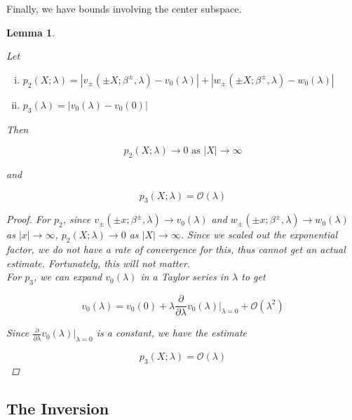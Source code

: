 \documentclass[12pt]{article}
\newtheorem{lemma}{Lemma}
\begin{document}
Finally, we have bounds involving the center subspace.


\begin{lemma}\label{centerbounds}

Let
\begin{enumerate}[(i)]
\item $p_2(X; \lambda) = |v_\pm(\pm X; \beta^\pm, \lambda) - v_0(\lambda)| + |w_\pm(\pm X; \beta^\pm, \lambda) - w_0(\lambda)|$
\item $p_3(\lambda) = |v_0(\lambda) - v_0(0)|$
\end{enumerate}

Then 

\begin{equation}\label{p2limit}
p_2(X; \lambda) \rightarrow 0 \text{ as } |X| \rightarrow \infty
\end{equation}

and

\begin{equation}\label{p3bound}
p_3(X; \lambda) = \mathcal{O}(\lambda)  
\end{equation}

\begin{proof}

For $p_2$, since $v_\pm(\pm x; \beta^\pm, \lambda) \rightarrow v_0(\lambda)$ and $w_\pm(\pm x; \beta^\pm, \lambda) \rightarrow w_0(\lambda)$ as $|x| \rightarrow \infty$, $p_2(X; \lambda) \rightarrow 0$ as $|X| \rightarrow \infty$. Since we scaled out the exponential factor, we do not have a rate of convergence for this, thus cannot get an actual estimate. Fortunately, this will not matter.\\

For $p_3$, we can expand $v_0(\lambda)$ in a Taylor series in $\lambda$ to get

\[
v_0(\lambda) = v_0(0) + \lambda \frac{\partial}{\partial \lambda}v_0(\lambda)\Big|_{\lambda = 0} + \mathcal{O}(\lambda^2)
\]

Since $\frac{\partial}{\partial \lambda}v_0(\lambda)\Big|_{\lambda = 0}$ is a constant, we have the estimate

\[
p_3(X; \lambda) = \mathcal{O}(\lambda) 
\]

\end{proof}
\end{lemma}

\subsection{The Inversion}
\end{document}
